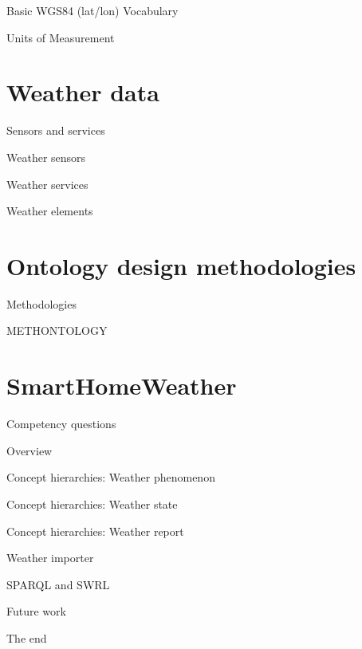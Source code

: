 \documentclass{beamer}
\begin{document}
\begin{frame}{Basic WGS84 (lat/lon) Vocabulary}
\end{frame}

\begin{frame}{Units of Measurement}
\end{frame}

\section{Weather data}

\begin{frame}{Sensors and services}
\end{frame}

\begin{frame}{Weather sensors}
\end{frame}

\begin{frame}{Weather services}
\end{frame}

\begin{frame}{Weather elements}
\end{frame}

\section{Ontology design methodologies}

\begin{frame}{Methodologies}
\end{frame}

\begin{frame}{METHONTOLOGY}
\end{frame}

\section{SmartHomeWeather}

\begin{frame}{Competency questions}
\end{frame}

\begin{frame}{Overview}
\end{frame}

\begin{frame}{Concept hierarchies: Weather phenomenon}
\end{frame}

\begin{frame}{Concept hierarchies: Weather state}
\end{frame}

\begin{frame}{Concept hierarchies: Weather report}
\end{frame}

\begin{frame}{Weather importer}
\end{frame}

\begin{frame}{SPARQL and SWRL}
\end{frame}

\begin{frame}{Future work}
\end{frame}

\begin{frame}{The end}
\end{frame}
\end{document}
